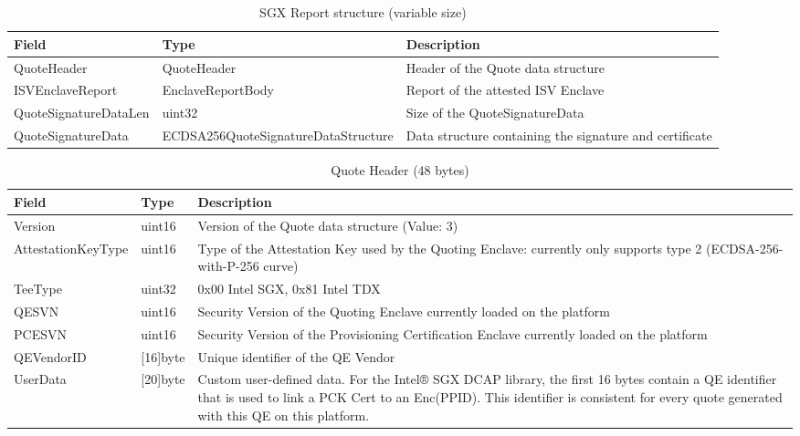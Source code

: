 \chapter{\appendixname}


\begin{table}[h]
	\begin{tabularx}{\textwidth}{|l|l|X|}
		\hline
		\textbf{Field}         & \textbf{Type}         & \textbf{Description} \\ \hline
		QuoteHeader            & QuoteHeader           &  Header of the Quote data structure \\ \hline
		ISVEnclaveReport       & EnclaveReportBody     & Report of the attested ISV Enclave \\ \hline
		QuoteSignatureDataLen  & uint32                & Size of the QuoteSignatureData \\ \hline
		QuoteSignatureData     & ECDSA256QuoteSignatureDataStructure & Data structure containing the signature and certificate \\ \hline
	\end{tabularx}
	\centering
	\caption{SGX Report structure (variable size) \cite{dcap_library_doc}}
	\label{quote-overview-table}
\end{table}

\begin{table}[h]
	\begin{tabularx}{\textwidth}{|l|l|X|}
		\hline
		\textbf{Field}         & \textbf{Type}         & \textbf{Description} \\ \hline
		Version                & uint16                & Version of the Quote data structure (Value: 3) \\ \hline
		AttestationKeyType     & uint16                & Type of the Attestation Key used by the Quoting Enclave: currently only supports type 2 (ECDSA-256-with-P-256 curve) \\ \hline
		TeeType                & uint32                & 0x00 Intel SGX, 0x81 Intel TDX \\ \hline
		QESVN                  & uint16                & Security Version of the Quoting Enclave currently loaded on the platform \\ \hline
		PCESVN                 & uint16                & Security Version of the Provisioning Certification Enclave currently loaded on the platform \\ \hline
		QEVendorID             & {[}16{]}byte          & Unique identifier of the QE Vendor \\ \hline
		UserData               & {[}20{]}byte          & Custom user-defined data. For the Intel® SGX DCAP library, the first 16 bytes contain a QE identifier that is used to link a PCK Cert to an Enc(PPID). This identifier is consistent for every quote generated with this QE on this platform. \\ \hline
	\end{tabularx}
	\centering
	\caption{Quote Header (48 bytes)  \cite{dcap_library_doc}}
	\label{quote-header-table}
\end{table}

